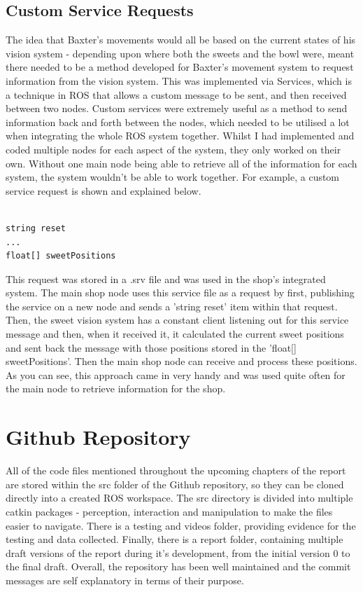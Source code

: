 \subsection{Custom Service Requests}
\label{ssec:customsrv}
The idea that Baxter's movements would all be based on the current states of his vision system - depending upon where both the sweets and the bowl were, meant there needed to be a method developed for Baxter's movement system to request information from the vision system. This was implemented via Services, which is a technique in ROS that allows a custom message to be sent, and then received between two nodes.
\newline\newline
Custom services were extremely useful as a method to send information back and forth between the nodes, which needed to be utilised a lot when integrating the whole ROS system together. Whilst I had implemented and coded multiple nodes for each aspect of the system, they only worked on their own. Without one main node being able to retrieve all of the information for each system, the system wouldn't be able to work together. For example, a custom service request is shown and explained below.
\begin{lstlisting}

string reset
...
float[] sweetPositions
\end{lstlisting}
\vspace{0.5cm}
This request was stored in a .srv file and was used in the shop's integrated system. The main shop node uses this service file as a request by first, publishing the service on a new node and sends a 'string reset' item within that request. Then, the sweet vision system has a constant client listening out for this service message and then, when it received it, it calculated the current sweet positions and sent back the message with those positions stored in the 'float[] sweetPositions'. Then the main shop node can receive and process these positions. As you can see, this approach came in very handy and was used quite often for the main node to retrieve information for the shop.
\section{Github Repository}
All of the code files mentioned throughout the upcoming chapters of the report are stored within the src folder of the Github repository, so they can be cloned directly into a created ROS workspace. The src directory is divided into multiple catkin packages - perception, interaction and manipulation to make the files easier to navigate. There is a testing and videos folder, providing evidence for the testing and data collected. Finally, there is a report folder, containing multiple draft versions of the report during it's development, from the initial version 0 to the final draft. Overall, the repository has been well maintained and the commit messages are self explanatory in terms of their purpose.
